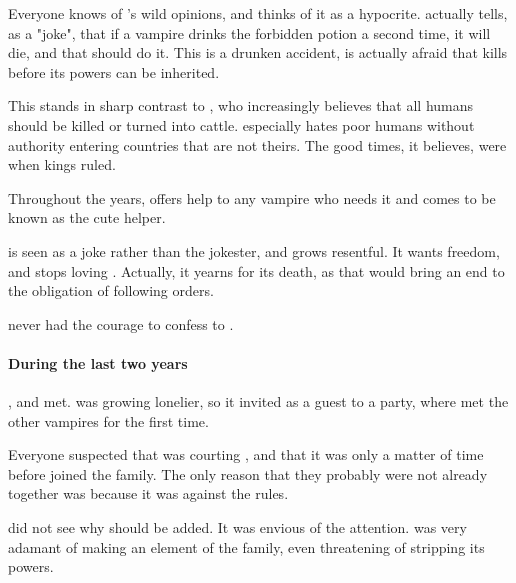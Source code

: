 Everyone knows of 's wild opinions, and thinks of it as a hypocrite.  actually tells, as a "joke", that if a vampire drinks the forbidden potion a second time, it will die, and that  should do it. This is a drunken accident,  is actually afraid that  kills  before its powers can be inherited.


This stands in sharp contrast to , who increasingly believes that all humans should be killed or turned into cattle.  especially hates poor humans without authority entering countries that are not theirs. The good times, it believes, were when kings ruled.

Throughout the years,  offers help to any vampire who needs it and comes to be known as the cute helper.

 is seen as a joke rather than the jokester, and grows resentful. It wants freedom, and stops loving . Actually, it yearns for its death, as that would bring an end to the obligation of following orders.



 never had the courage to confess to .

\paragraph{During the last two years}

,  and  met.  was growing lonelier, so it invited  as a guest to a party, where  met the other vampires for the first time.

Everyone suspected that  was courting , and that it was only a matter of time before  joined the family. The only reason that they probably were not already together was because it was against the rules.

 did not see why  should be added. It was envious of the attention.  was very adamant of making  an element of the family, even threatening  of stripping its powers.

